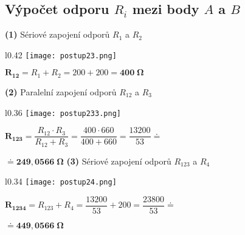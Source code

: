 \documentclass[a4paper,12pt]{article}
\begin{document}
\subsection{Výpočet odporu $R_i$ mezi body $A$ a $B$}\par
\hspace{1em}\textbf{(1)} Sériové zapojení odporů $R_1$ a $R_2$\par\vspace{0.8em}
\begin{wrapfigure}{l}{0.42\textwidth}
\vspace{-60pt}
\texttt{[image: postup23.png]}
\vspace{-70pt}
\end{wrapfigure}
\vspace{43pt}
\hspace{1em}$\mathbf{R_{12}}=R_1+R_2=200+200=\mathbf{400 \;\si{\Omega}}$\par\vspace{5.5em}
\hspace{1em}\textbf{(2)} Paralelní zapojení odporů $R_{12}$ a $R_3$\par\vspace{0.8em}
\begin{wrapfigure}{l}{0.36\textwidth}
\vspace{-52pt}
\texttt{[image: postup233.png]}
\vspace{-75pt}
\end{wrapfigure}
\vspace{33pt}
\hspace{1em}$\mathbf{R_{123}}=\dfrac{R_{12}\cdot R_3}{R_{12}+R_3}=\dfrac{400\cdot 660}{400+660}=\dfrac{13200}{53}\doteq$\par\hspace{1em}$\doteq \mathbf{ 249,0566 \;\si{\Omega}}$\newpage
\hspace{1em}\textbf{(3)} Sériové zapojení odporů $R_{123}$ a $R_4$\par\vspace{0.8em}
\begin{wrapfigure}{l}{0.34\textwidth}
\vspace{-48pt}
\texttt{[image: postup24.png]}
\vspace{-75pt}
\end{wrapfigure}
\vspace{28pt}
\hspace{1em}$\mathbf{R_{1234}}=R_{123}+R_4=\dfrac{13200}{53}+200=\dfrac{23800}{53}\doteq$\par\hspace{1em}$\doteq \mathbf{ 449,0566 \;\si{\Omega}}$\par\vspace{5.2em}
\end{document}
